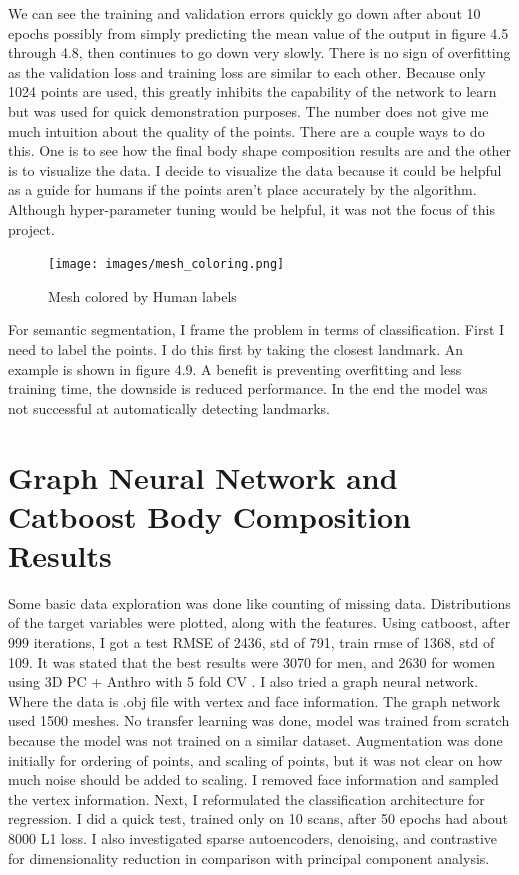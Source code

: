 We can see the training and validation errors quickly go down after about 10 epochs possibly from simply predicting the mean value of the output in figure 4.5 through 4.8, then continues to go down very slowly. There is no sign of overfitting as the validation loss and training loss are similar to each other. Because only 1024 points are used, this greatly inhibits the capability of the network to learn but was used for quick demonstration purposes. The number does not give me much intuition about the quality of the points. There are a couple ways to do this. One is to see how the final body shape composition results are and the other is to visualize the data. I decide to visualize the data because it could be helpful as a guide for humans if the points aren't place accurately by the algorithm. Although hyper-parameter tuning would be helpful, it was not the focus of this project. 

\begin{figure}[!htb]
	\caption{Mesh colored by Human labels}
	\centering
	\texttt{[image: images/mesh\_coloring.png]}
\end{figure}

For semantic segmentation, I frame the problem in terms of classification. First I need to label the points. I do this first by taking the closest landmark. An example is shown in figure 4.9. A benefit is preventing overfitting and less training time, the downside is reduced performance. In the end the model was not successful at automatically detecting landmarks.

\section{Graph Neural Network and Catboost Body Composition Results}

Some basic data exploration was done like counting of missing data. Distributions of the target variables were plotted, along with the features. Using catboost, after 999 iterations, I got a test RMSE of 2436, std of 791, train rmse of 1368, std of 109. It was stated that the best results were 3070 for men, and 2630 for women using 3D PC + Anthro with 5 fold CV \cite{article}. I also tried a graph neural network. Where the data is .obj file with vertex and face information. The graph network used 1500 meshes. No transfer learning was done, model was trained from scratch because the model was not trained on a similar dataset. Augmentation was done initially for ordering of points, and scaling of points, but it was not clear on how much noise should be added to scaling. I removed face information and sampled the vertex information. Next, I reformulated the classification architecture for regression. I did a quick test, trained only on 10 scans, after 50 epochs had about 8000 L1 loss. I also investigated sparse autoencoders, denoising, and contrastive for dimensionality reduction in comparison with principal component analysis.

